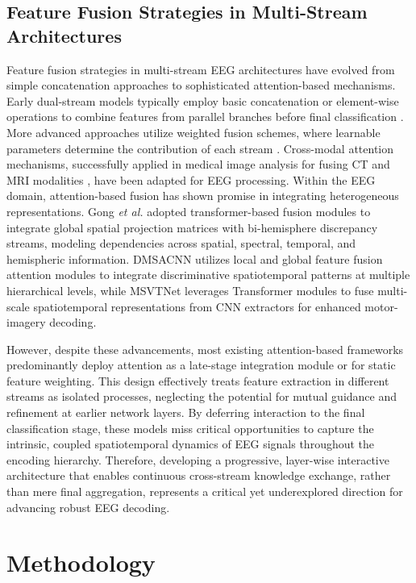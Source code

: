 \documentclass[journal]{IEEEtran}
\theoremstyle{plain}
\begin{document}
\subsection{Feature Fusion Strategies in Multi-Stream Architectures}
Feature fusion strategies in multi-stream EEG architectures have evolved from simple concatenation approaches to sophisticated attention-based mechanisms. Early dual-stream models typically employ basic concatenation or element-wise operations to combine features from parallel branches before final classification \cite{li2021novel, li2022ts}. More advanced approaches utilize weighted fusion schemes, where learnable parameters determine the contribution of each stream \cite{sun2022dbgcn}. Cross-modal attention mechanisms, successfully applied in medical image analysis for fusing CT and MRI modalities \cite{liu2025review}, have been adapted for EEG processing. Within the EEG domain, attention-based fusion has shown promise in integrating heterogeneous representations. Gong \textit{et al.} \cite{Gong2024Bi-Hemi} adopted transformer-based fusion modules to integrate global spatial projection matrices with bi-hemisphere discrepancy streams, modeling dependencies across spatial, spectral, temporal, and hemispheric information. DMSACNN \cite{Liu2025DMSACNN} utilizes local and global feature fusion attention modules to integrate discriminative spatiotemporal patterns at multiple hierarchical levels, while MSVTNet \cite{liu2024msvtnet} leverages Transformer modules to fuse multi-scale spatiotemporal representations from CNN extractors for enhanced motor-imagery decoding.

However, despite these advancements, most existing attention-based frameworks predominantly deploy attention as a late-stage integration module or for static feature weighting. This design effectively treats feature extraction in different streams as isolated processes, neglecting the potential for mutual guidance and refinement at earlier network layers. By deferring interaction to the final classification stage, these models miss critical opportunities to capture the intrinsic, coupled spatiotemporal dynamics of EEG signals throughout the encoding hierarchy. Therefore, developing a progressive, layer-wise interactive architecture that enables continuous cross-stream knowledge exchange, rather than mere final aggregation, represents a critical yet underexplored direction for advancing robust EEG decoding.


\section{Methodology}
\end{document}
